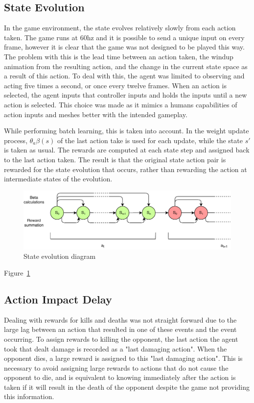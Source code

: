 \subsection{State Evolution}
In the game environment, the state evolves relatively slowly from each action taken. The game runs at 60hz and it is possible to send a unique input on every frame, however it is clear that the game was not designed to be played this way. The problem with this is the lead time between an action taken, the windup animation from the resulting action, and the change in the current state space as a result of this action. To deal with this, the agent was limited to observing and acting five times a second, or once every twelve frames. When an action is selected, the agent inputs that controller inputs and holds the inputs until a new action is selected. This choice was made as it mimics a humans capabilities of action inputs and meshes better with the intended gameplay.

While performing batch learning, this is taken into account. In the weight update process, $\theta_a\beta(s)$ of the last action take is used for each update, while the state $s'$ is taken as usual. The rewards are computed at each state step and assigned back to the last action taken. The result is that the original state action pair is rewarded for the state evolution that occurs, rather than rewarding the action at intermediate states of the evolution. 

\begin{figure}[!htb]
	\centering
	\includegraphics[width=120mm]{stateevolution.pdf}
	\caption{State evolution diagram}
	\label{fig:stateevo}
\end{figure}

Figure~\ref{fig:stateevo}

\subsection{Action Impact Delay}

Dealing with rewards for kills and deaths was not straight forward due to the large lag between an action that resulted in one of these events and the event occurring. To assign rewards to killing the opponent, the last action the agent took that dealt damage is recorded as a "last damaging action". When the opponent dies, a large reward is assigned to this "last damaging action". This is necessary to avoid assigning large rewards to actions that do not cause the opponent to die, and is equivalent to knowing immediately after the action is taken if it will result in the death of the opponent despite the game not providing this information.





